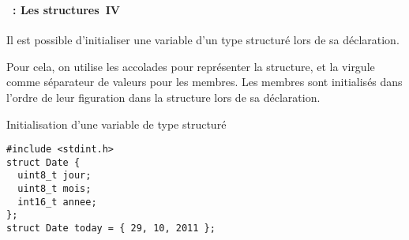 \begin{frame}[containsverbatim]
  \frametitle{\secname}
  \framesubtitle{\subsecname~: Les structures~IV} 
  
  Il est possible d'initialiser une variable d'un type structuré lors de sa déclaration.
  \vspace{0.3cm}
  \par
  Pour cela, on utilise les accolades pour représenter la structure, et la virgule comme séparateur de valeurs pour les membres.
  Les membres sont initialisés dans l'ordre de leur figuration dans la structure lors de sa déclaration.
  \vspace{0.3cm}
  \begin{exampleblock}{Initialisation d'une variable de type structuré}
    \begin{verbatim}
#include <stdint.h>    
struct Date {
  uint8_t jour;
  uint8_t mois;
  int16_t annee;
};    
struct Date today = { 29, 10, 2011 };\end{verbatim}
  \end{exampleblock}
\end{frame}

